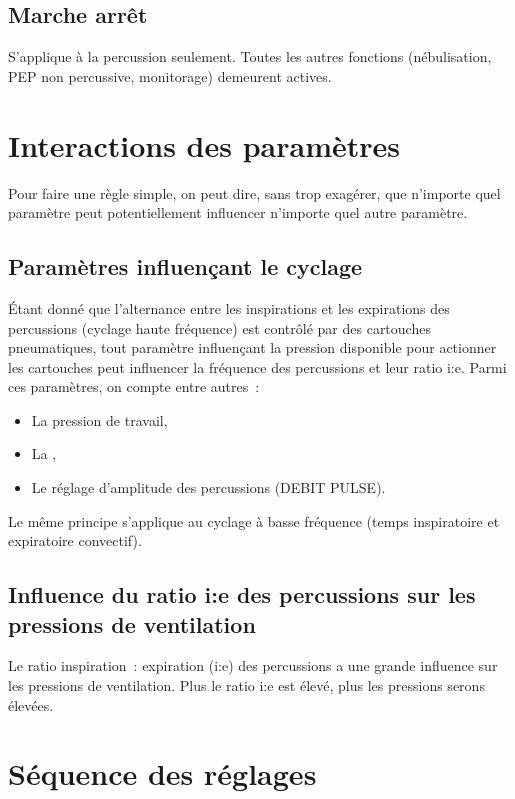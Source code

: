 \subsection{Marche arrêt}

S’applique à la percussion seulement. Toutes les autres fonctions
(nébulisation, PEP non percussive, monitorage) demeurent actives.

\section{Interactions des paramètres}

Pour faire une règle simple, on peut dire, sans trop exagérer, que n'importe
quel paramètre peut potentiellement influencer n'importe quel autre paramètre. 

\subsection{Paramètres influençant le cyclage}

Étant donné que l’alternance entre les inspirations et les expirations des
percussions (cyclage haute fréquence)  est contrôlé par des cartouches
pneumatiques, tout paramètre influençant la pression disponible pour actionner
les cartouches peut influencer la fréquence des percussions et leur ratio i:e.
Parmi ces paramètres, on compte entre autres :

\begin{itemize}
\item La pression de travail, 
\item La \fio, 
\item Le réglage d’amplitude des percussions (DEBIT PULSE).
\end{itemize}

Le même principe s’applique au cyclage à basse fréquence (temps inspiratoire et
expiratoire convectif).

\subsection{Influence du ratio i:e des percussions sur les pressions de ventilation}

Le ratio inspiration : expiration (i:e) des percussions a une grande influence
sur les pressions de ventilation. Plus le ratio i:e est élevé, plus les
pressions serons élevées.

\section{Séquence des réglages}

